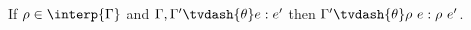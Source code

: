 \begin{lemma}
  \label{lemma:substitution_kinding_typing}
  If $\rho \in \interp{\Gamma}$ and $\Gamma,\Gamma' \tvdash{\theta} e:e'$ then $\Gamma' \tvdash{\theta} \rho\ e:\rho\ e'$.
\end{lemma}
